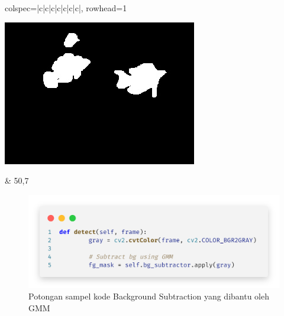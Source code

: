 \begin{longtblr}[
            caption = {Hasil uji coba proses \textit{background subtraction} menggunakan GMM terhadap video indeks gt\textunderscore116},
            label = {tab:gmm_116}
        ]{
            colspec={|c|c|c|c|c|c|c|},
            rowhead=1
        }
\begin{minipage}{0.24\textwidth}
            	\includegraphics[width=\linewidth]{image/gt_116/gt_116_groundtruth_1167.jpg}
            \end{minipage} &
            50,7 \\ \hline
        \end{longtblr}

        \vspace{-0.5cm}
        \begin{figure}[H]
        \centering
          \singlespacing
          \captionsetup{justification=centering,margin=0.5cm}
          \includegraphics[width=14cm]{image/CodeSnap/gmm.png}
          \caption{Potongan sampel kode Background Subtraction yang dibantu oleh GMM}
          \label{fig:Potongan sampel kode gmm}
        \end{figure}
    
